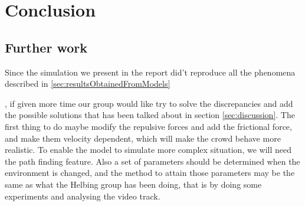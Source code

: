 \section{Conclusion}
\label{sec:conclusion}

\subsection{Further work}
Since the simulation we present in the report did't reproduce all the phenomena described in \ref{sec:resultsObtainedFromModels}

, if given more time our group would like try to solve the
discrepancies and add the possible solutions that has been talked about in
section \ref{sec:discussion}. The first thing to do maybe modify the repulsive
forces and add the frictional force, and make them velocity dependent, which
will make the crowd behave more realistic.  To enable the model to simulate
more complex situation, we will need the path finding feature. Also a set of
parameters should be determined when the environment is changed, and the
method to attain those parameters may be the same as what the Helbing group
has been doing, that is by doing some experiments and analysing the video
track.
